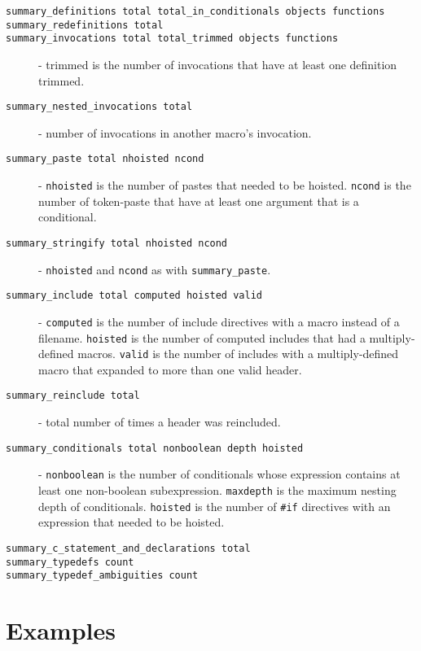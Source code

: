 \documentclass{report}
\begin{document}
\begin{description}
\item[\texttt{summary\_definitions total total\_in\_conditionals objects functions}]
\item[\texttt{summary\_redefinitions total}]
\item[\texttt{summary\_invocations total total\_trimmed objects functions}] - trimmed is the
  number of invocations that have at least one definition trimmed.
\item[\texttt{summary\_nested\_invocations total}] - number of invocations in
  another macro's invocation.
\item[\texttt{summary\_paste total nhoisted ncond}] - \verb"nhoisted" is the
  number of pastes that needed to be hoisted.  \verb"ncond" is the number
  of token-paste that have at least one argument that is a
  conditional.
\item[\texttt{summary\_stringify total nhoisted ncond}] - \verb"nhoisted" and
  \verb"ncond" as with \verb"summary_paste".
\item[\texttt{summary\_include total computed hoisted valid}] - \verb"computed"
  is the number of include directives with a macro instead of a
  filename.  \verb"hoisted" is the number of computed includes that had a
  multiply-defined macros.  \verb"valid" is the number of includes with a
  multiply-defined macro that expanded to more than one valid header.
\item[\texttt{summary\_reinclude total}] - total number of times a header was
  reincluded.
\item[\texttt{summary\_conditionals total nonboolean depth hoisted}] -
  \verb"nonboolean" is the number of conditionals whose expression contains
  at least one non-boolean subexpression. \verb"maxdepth" is the maximum
  nesting depth of conditionals.  \verb"hoisted" is the number of \verb"#if"
  directives with an expression that needed to be hoisted.
\item[\texttt{summary\_c\_statement\_and\_declarations total}]
\item[\texttt{summary\_typedefs count}]
\item[\texttt{summary\_typedef\_ambiguities count}]
\end{description}




\section{Examples}
\end{document}
